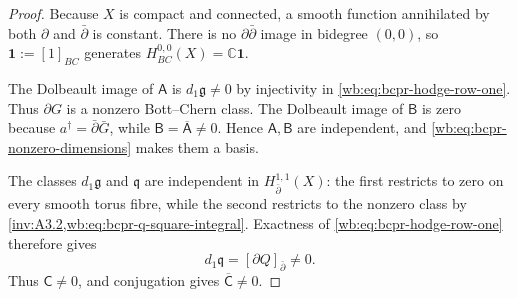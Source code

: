 \begin{proof}
Because $X$ is compact and connected, a smooth function annihilated by both
$\partial$ and $\bar\partial$ is constant.  There is no
$\partial\bar\partial$ image in bidegree $(0,0)$, so
$\mathbf1:=[1]_{BC}$ generates
$H^{0,0}_{BC}(X)=\mathbb C\mathbf1$.

The Dolbeault image of $\mathsf A$ is
$d_1\mathfrak g\neq0$ by injectivity in
\cref{wb:eq:bcpr-hodge-row-one}.  Thus $\partial G$ is a nonzero
Bott--Chern class.  The Dolbeault image of $\mathsf B$ is zero because
$a^\dagger=\bar\partial\bar G$, while
$\mathsf B=\overline{\mathsf A}\neq0$.  Hence
$\mathsf A,\mathsf B$ are independent, and
\cref{wb:eq:bcpr-nonzero-dimensions} makes them a basis.

The classes $d_1\mathfrak g$ and $\mathfrak q$ are independent in
$H^{1,1}_{\bar\partial}(X)$: the first restricts to zero on every smooth
torus fibre, while the second restricts to the nonzero class
by \cref{inv:A3.2,wb:eq:bcpr-q-square-integral}.  Exactness of
\cref{wb:eq:bcpr-hodge-row-one} therefore gives
\begin{equation}
 d_1\mathfrak q=[\partial Q]_{\bar\partial}\neq0.
\label{wb:eq:bcpr-c-nonzero}
\end{equation}
Thus $\mathsf C\neq0$, and conjugation gives
$\overline{\mathsf C}\neq0$.


\end{proof}
